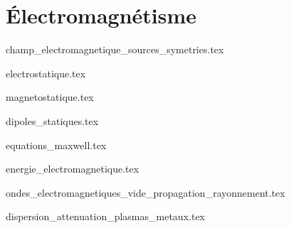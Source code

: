 \part{Électromagnétisme}

{champ_electromagnetique_sources_symetries.tex}

{electrostatique.tex}

{magnetostatique.tex}

{dipoles_statiques.tex}

{equations_maxwell.tex}

{energie_electromagnetique.tex}

{ondes_electromagnetiques_vide_propagation_rayonnement.tex}

{dispersion_attenuation_plasmas_metaux.tex}